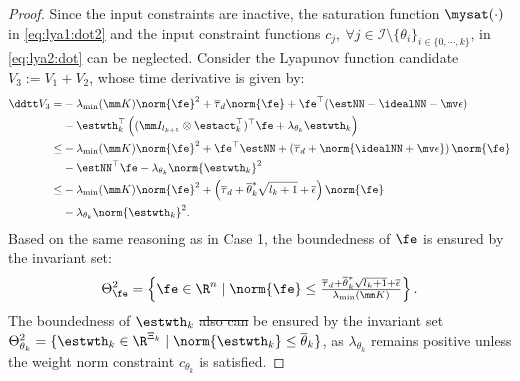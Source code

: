 \documentclass[letterpaper, journal]{IEEEtran}
\providecommand{\DIFadd}[1]{{\protect\color{blue}\uwave{#1}}} %
\providecommand{\DIFdel}[1]{{\protect\color{red}\sout{#1}}} %
\providecommand{\DIFaddbegin}{} %
\providecommand{\DIFaddend}{} %
\providecommand{\DIFdelbegin}{} %
\providecommand{\DIFdelend}{} %
\begin{document}
\begin{proof}
Since the input constraints are inactive, the saturation function $\mysat(\cdot)$ in \eqref{eq:lya1:dot2} and the input constraint functions $c_j,\ \forall j\in\mathcal I \setminus \{\theta_i\}_{i\in\{0,\cdots,k\}}$, in \eqref{eq:lya2:dot} can be neglected.
Consider the Lyapunov function candidate $V_3:=V_1+V_2$, whose time derivative is given by:
\begin{equation}
    \begin{aligned}
        \ddtt V_3
        =&
        -\lambda_{\min}(\mm K)\norm{\fe}^2
        +\overline\tau_d\norm{\fe}
        +\fe^\top (\estNN - \idealNN - \mv\epsilon)
        \\
        &
        -\estwth_k^\top 
        \left(
            (\mm I_{l_{k+1}}\otimes \estact_k^\top)^\top
            \fe
            +
            \lambda_{\theta_k}\estwth_k
        \right)
        \\
        \le&
        -\lambda_{\min}(\mm K)\norm{\fe}^2
        +\fe^\top \estNN
        +
        \left(
            \overline\tau_d+\norm{
                \idealNN+\mv\epsilon
            }
        \right)
        \norm{\fe}
        \\
        &
        -\estNN^\top\fe 
        -\lambda_{\theta_k}\norm{\estwth_k}^2
        \\
        \le&
        -
        \lambda_{\min}(\mm K)
        \norm{\fe}^2
        +
        \left(
            \overline\tau_d
            +
            \overline{\theta}^*_k\sqrt{l_{k}+1}
            +
            \overline{\epsilon}
        \right)
        \norm{\fe}
        \\
        &
        -
        \lambda_{\theta_k}\norm{\estwth_k}^2
        .
    \end{aligned}
    \label{eq:lya3:dot}
\end{equation}
Based on the same reasoning as in Case 1, the boundedness of $\fe$ is ensured by the invariant set:
\begin{equation}
    \Theta_{\fe}^{2}
    =
    \left\{ 
        \fe \in \R^n 
        \mid 
        \norm{\fe} 
        \le 
        \tfrac{
            \overline\tau_d
            +
            \overline{\theta}^*_k\sqrt{l_{k}+1}
            +
            \overline{\epsilon}
        }{
            \lambda_{\min}(\mm K)
        }
    \right\}
    .
\end{equation}
The boundedness of $\estwth_k$ \DIFdelbegin \DIFdel{also can }\DIFdelend \DIFaddbegin \DIFadd{can also }\DIFaddend be ensured by the invariant set $\Theta_{\theta_k}^{2}=\{ \estwth_k \in \R^{\Xi_{k}} \mid \norm{\estwth_k} \le \overline\theta_k \}$, as $\lambda_{\theta_k}$ remains positive unless the weight norm constraint $c_{\theta_k}$ is satisfied.


\end{proof}
\end{document}
